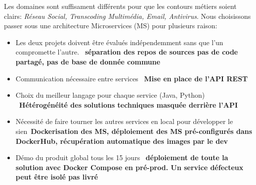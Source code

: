 \documentclass[portrait,final,a0paper]{baposter}
\begin{document}
\begin{poster}
{\begin{multicols}{2}
	Les domaines sont suffisament différents pour que les contours métiers soient clairs: \textit{Réseau Social, Transcoding Multimédia, Email, Antivirus}. Nous choisissons passer sous une architecture Microservices (MS) pour plusieurs raison:
	\begin{itemize}
		\item Les deux projets doivent être évalués indépendemment sans que l'un compromette l'autre. \MVRightarrow \  \textbf{séparation des repos de sources pas de code partagé, pas de base de donnée commune}
		\item Communication nécessaire entre services \MVRightarrow \ \textbf{Mise en place de l'API REST}
		\item Choix du meilleur langage pour chaque service (Java, Python) \MVRightarrow \ \textbf{Hétérogénéité des solutions techniques masquée derrière l'API}
		\item Nécessité de faire tourner les autres services en local pour développer le sien\MVRightarrow \ \textbf{Dockerisation des MS, déploiement des MS pré-configurés dans DockerHub, récupération automatique des images par le dev }
		\item Démo du produit global tous les 15 jours \MVRightarrow \ \textbf{déploiement de toute la solution avec Docker Compose en pré-prod. Un service défecteux peut être isolé pas livré}
	\end{itemize} 
	
					
	\end{multicols}
	
   
 }
 
\end{poster}
\end{document}
